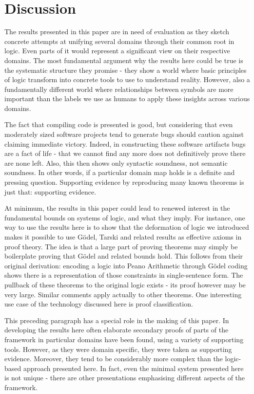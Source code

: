 \section{Discussion}
\label{sec:discussion}

The results presented in this paper are in need of evaluation as they sketch concrete attempts at unifying several domains through their common root in logic. Even parts of it would represent a significant view on their respective domains. The most fundamental argument why the results here could be true is the systematic structure they promise - they show a world where basic principles of logic transform into concrete tools to use to understand reality. However, also a fundamentally different world where relationships between symbols are more important than the labels we use as humans to apply these insights across various domains. 

The fact that compiling code is presented is good, but considering that even moderately sized software projects tend to generate bugs should caution against claiming immediate victory. Indeed, in constructing these software artifacts bugs are a fact of life - that we cannot find any more does not definitively prove there are none left. Also, this then shows only syntactic soundness, not semantic soundness. In other words, if a particular domain map holds is a definite and pressing question. Supporting evidence by reproducing many known theorems is just that: supporting evidence. 

At minimum, the results in this paper could lead to renewed interest in the fundamental bounds on systems of logic, and what they imply. For instance, one way to use the results here is to show that the deformation of logic we introduced makes it possible to use Gödel, Tarski and related results as effective axioms in proof theory. The idea is that a large part of proving theorems may simply be boilerplate proving that Gödel and related bounds hold. This follows from their original derivation: encoding a logic into Peano Arithmetic through Gödel coding shows there is a representation of those constraints in single-sentence form. The pullback of these theorems to the original logic exists - its proof however may be very large. Similar comments apply actually to other theorems. One interesting use case of the technology discussed here is proof classification. 

This preceding paragraph has a special role in the making of this paper. In developing the results here often elaborate secondary proofs of parts of the framework in particular domains have been found, using a variety of supporting tools. However, as they were domain specific, they were taken as supporting evidence. Moreover, they tend to be considerably more complex than the logic-based approach presented here. In fact, even the minimal system presented here is not unique - there are other presentations emphasising different aspects of the framework. 

